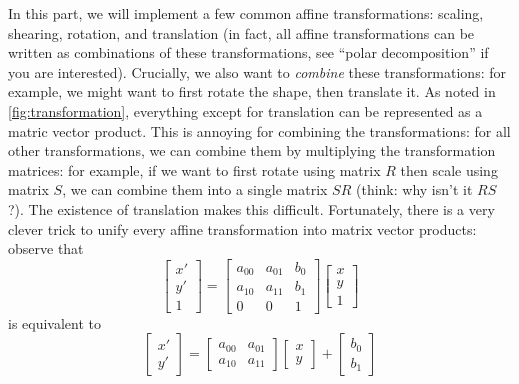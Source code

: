 In this part, we will implement a few common affine transformations: scaling, shearing, rotation, and translation (in fact, all affine transformations can be written as combinations of these transformations, see ``polar decomposition'' if you are interested). Crucially, we also want to \emph{combine} these transformations: for example, we might want to first rotate the shape, then translate it. As noted in \cref{fig:transformation}, everything except for translation can be represented as a matric vector product. This is annoying for combining the transformations: for all other transformations, we can combine them by multiplying the transformation matrices: for example, if we want to first rotate using matrix $R$ then scale using matrix $S$, we can combine them into a single matrix $S R$ (think: why isn't it $R S$?). The existence of translation makes this difficult. Fortunately, there is a very clever trick to unify every affine transformation into matrix vector products: observe that
\begin{equation}
\begin{bmatrix}
x' \\ y' \\ 1
\end{bmatrix}
=
\begin{bmatrix}
a_{00} & a_{01} & b_{0} \\
a_{10} & a_{11} & b_{1} \\
0 & 0 & 1
\end{bmatrix}
\begin{bmatrix}
x \\ y \\ 1
\end{bmatrix}
\end{equation}
is equivalent to
\begin{equation}
\begin{bmatrix}
x' \\ y'
\end{bmatrix}
=
\begin{bmatrix}
a_{00} & a_{01} \\
a_{10} & a_{11}
\end{bmatrix}
\begin{bmatrix}
x \\ y
\end{bmatrix}
+
\begin{bmatrix}
b_0 \\ b_1
\end{bmatrix}
\end{equation}

